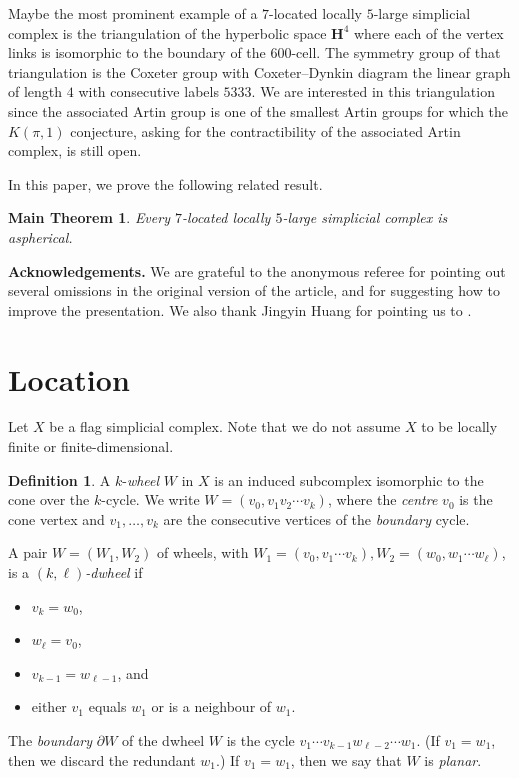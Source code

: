 \documentclass[a4paper,12pt,leqno]{amsart}
\newtheorem*{thm*}{Main Theorem}
\theoremstyle{definition}
\newtheorem{defn}[thm]{Definition}
\newcommand{\Hp}{\mathbf{H}}
\begin{document}
Maybe the most prominent example of a $7$-located locally $5$-large simplicial complex is the triangulation of the hyperbolic space $\Hp^4$ where each of the vertex links is isomorphic to the boundary of the $600$-cell. The symmetry group of that triangulation is the Coxeter group with Coxeter--Dynkin diagram the linear graph of length $4$ with consecutive labels $5333$. We are interested in this triangulation since the associated Artin group is one of the smallest Artin groups for which the $K(\pi,1)$ conjecture, asking for the contractibility of the associated Artin complex, is still open.

In this paper, we prove the following related result.

\begin{thm*}
Every $7$-located locally $5$-large simplicial complex is aspherical.
\end{thm*}

\noindent \textbf{Acknowledgements.} We are grateful to the anonymous referee for pointing out several omissions in the original version of the article, and for suggesting how to improve the presentation.
We also thank Jingyin Huang for pointing us to \cite{Bj}.

\section{Location}
Let $X$ be a flag simplicial complex. Note that we do not assume $X$ to be locally finite or finite-dimensional.

\begin{defn}
A $k$-\emph{wheel} $W$ in $X$ is an induced subcomplex isomorphic to the cone over the $k$-cycle. We write $W = (v_0, v_1v_2\cdots v_k)$, where the \emph{centre} $v_0$ is the cone vertex and $v_1,\ldots,v_k$ are the consecutive vertices of the \emph{boundary} cycle.

A pair $W=(W_1,W_2)$ of wheels, with $W_1=(v_0, v_1\cdots v_k),W_2=(w_0, w_1\cdots w_\ell)$, is a \emph{$(k,\ell)$-dwheel} if
    \begin{itemize}
        \item $v_k = w_0$, 
        \item $w_\ell = v_0$,
        \item $v_{k-1} = w_{\ell - 1}$, and
        \item either $v_1$ equals $w_1$ or is a neighbour of $w_1$.
    \end{itemize}
    The \emph{boundary} $\partial W$ of the dwheel $W$ is the cycle    
    $v_1\cdots v_{k-1}w_{\ell - 2} \cdots w_1$. (If $v_1 = w_1$, then we discard the redundant $w_1$.) 
    If $v_1 = w_1$, then we say that $W$ is \emph{planar}. 
\end{defn}
\end{document}

